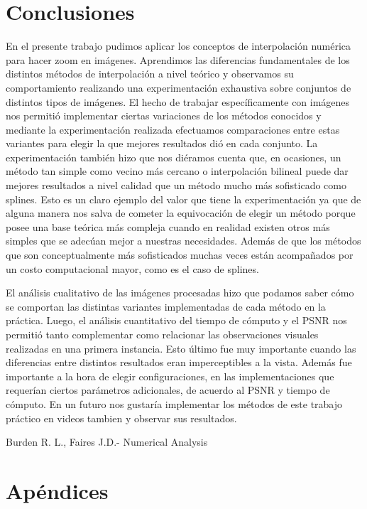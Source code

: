 \documentclass[a4paper]{article}
\begin{document}
\section{Conclusiones}
En el presente trabajo pudimos aplicar los conceptos de interpolación numérica para hacer zoom en imágenes. Aprendimos las diferencias fundamentales de los distintos métodos de interpolación a nivel teórico y observamos su comportamiento realizando una experimentación exhaustiva sobre conjuntos de distintos tipos de imágenes. El hecho de trabajar específicamente con imágenes nos permitió implementar ciertas variaciones de los métodos conocidos y mediante la experimentación realizada efectuamos comparaciones entre estas variantes para elegir la que mejores resultados dió en cada conjunto.  La experimentación también hizo que nos diéramos cuenta que, en ocasiones, un método tan simple como vecino más cercano o interpolación bilineal puede dar mejores resultados a nivel calidad que un método mucho más sofisticado como splines. Esto es un claro ejemplo del valor que tiene la experimentación ya que de alguna manera nos salva de cometer la equivocación de elegir un método porque posee una base teórica más compleja cuando en realidad existen otros más simples que se adecúan mejor a nuestras necesidades. Además de que los métodos que son conceptualmente más sofisticados muchas veces están acompañados por un costo computacional mayor, como es el caso de splines.
\par El análisis cualitativo de las imágenes procesadas hizo que podamos saber cómo se comportan las distintas variantes implementadas de cada método en la práctica. Luego, el análisis cuantitativo del tiempo de cómputo y el PSNR nos permitió tanto complementar como relacionar las observaciones visuales realizadas en una primera instancia. Esto último fue muy importante cuando las diferencias entre distintos resultados eran imperceptibles a la vista. Además fue importante a la hora de elegir configuraciones, en las implementaciones que requerían ciertos parámetros adicionales, de acuerdo al PSNR y tiempo de cómputo.
En un futuro nos gustar\'ia implementar los m\'etodos de este trabajo pr\'actico en videos tambien y observar sus resultados.
\begin{thebibliography}{abbrvnat}
 Burden R. L., Faires J.D.- Numerical Analysis
\end{thebibliography}


\section{Apéndices}
\end{document}
